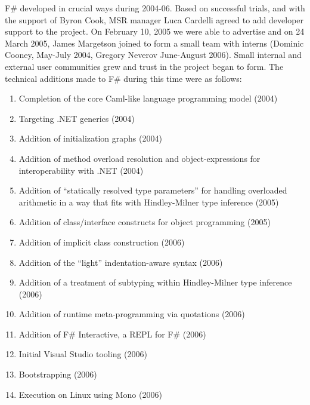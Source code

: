 \documentclass[acmsmall,screen]{acmart}
\begin{document}
F\# developed in crucial ways during 2004-06.  Based on successful trials, and with the support of Byron Cook, MSR manager Luca Cardelli
agreed to add developer support to the project. On February 10, 2005 we were able to advertise and on 24 March 2005, James Margetson
joined to form a small team with interns (Dominic Cooney, May-July 2004, Gregory Neverov June-August 2006). Small internal and external
user communities grew and trust in the project began to form. The technical additions made to F\# during this time were as follows:

\begin{enumerate}
\item Completion of the core Caml-like language programming model (2004)
\item Targeting .NET generics (2004)
\item Addition of initialization graphs (2004)
\item Addition of method overload resolution and object-expressions for interoperability with .NET (2004)
\item Addition of “statically resolved type parameters” for handling overloaded arithmetic in a way that fits with Hindley-Milner type inference (2005)
\item Addition of class/interface constructs for object programming (2005)
\item Addition of implicit class construction (2006)
\item Addition of the “light” indentation-aware syntax (2006)
\item Addition of a treatment of subtyping within Hindley-Milner type inference (2006)
\item Addition of runtime meta-programming via quotations (2006)
\item Addition of F\# Interactive, a REPL for F\# (2006)
\item Initial Visual Studio tooling (2006)
\item Bootstrapping (2006)
\item Execution on Linux using Mono (2006)
\end{enumerate}
\end{document}

